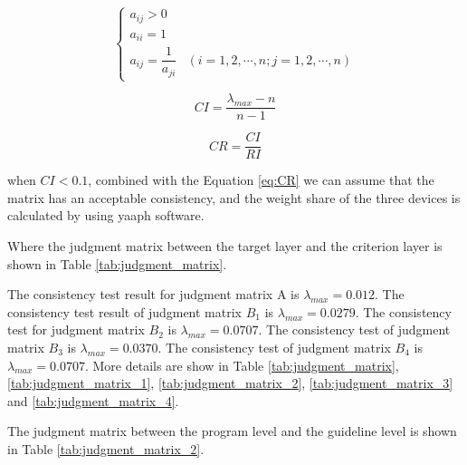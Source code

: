 \documentclass[12pt]{article}
\begin{document}
\begin{equation}
    \left\{
    \begin{aligned}
        a_{ij}>0                                                   \\
        a_{ii}=1                                                   \\
        a_{ij}=\dfrac{1}{a_{ji}} & (i=1,2,\cdots,n;j=1,2,\cdots,n)
    \end{aligned}
    \right.
\end{equation}



\begin{equation}
    CI=\dfrac{\lambda_{max}-n}{n-1} \label{eq:CI}
\end{equation}

\begin{equation}
    CR=\dfrac{CI}{RI} \label{eq:CR}
\end{equation}

when $CI<0.1$, combined with the Equation \ref{eq:CR} we can assume that the matrix has an acceptable consistency, and the weight share of the three devices is calculated by using yaaph software.

Where the judgment matrix between the target layer and the criterion layer is shown in Table \ref{tab:judgment_matrix}.



\begin{table}[h!]

\end{table}

The consistency test result for judgment matrix A is $\lambda_{max}=0.012$. The consistency test result of judgment matrix $B_{1}$ is $\lambda_{max}=0.0279$. The consistency test for judgment matrix $B_{2}$ is $\lambda_{max}=0.0707$. The consistency test of judgment matrix $B_{3}$ is $\lambda_{max}=0.0370$. The consistency test of judgment matrix $B_{4}$ is $\lambda_{max}=0.0707$. More details are show in Table \ref{tab:judgment_matrix}, \ref{tab:judgment_matrix_1}, \ref{tab:judgment_matrix_2}, \ref{tab:judgment_matrix_3} and \ref{tab:judgment_matrix_4}.

The judgment matrix between the program level and the guideline level is shown in Table \ref{tab:judgment_matrix_2}.
\end{document}

